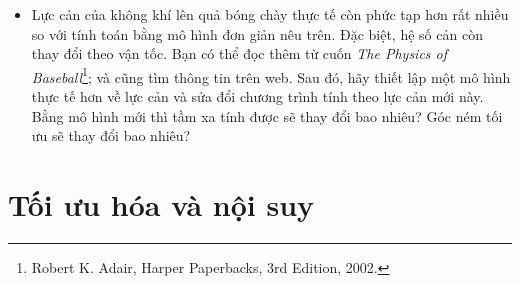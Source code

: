 \documentclass[12pt]{book}
\begin{document}
\begin{ex}
\begin{itemize}
\item Lực cản của không khí lên quả bóng chày thực tế còn phức tạp
hơn rất nhiều so với tính toán bằng mô hình đơn giản nêu trên. Đặc biệt,
hệ số cản còn thay đổi theo vận tốc. Bạn có thể đọc thêm từ cuốn
{\em The Physics of Baseball}\footnote{Robert K. Adair, Harper Paperbacks, 3rd
Edition, 2002.}; và cũng tìm thông tin trên web. Sau đó, hãy thiết lập
một mô hình thực tế hơn về lực cản và sửa đổi chương trình tính theo
lực cản mới này. Bằng mô hình mới thì tầm xa tính được sẽ thay đổi
bao nhiêu? Góc ném tối ưu sẽ thay đổi bao nhiêu?

\end{itemize}

\end{ex}


\chapter{Tối ưu hóa và nội suy}
\end{document}
